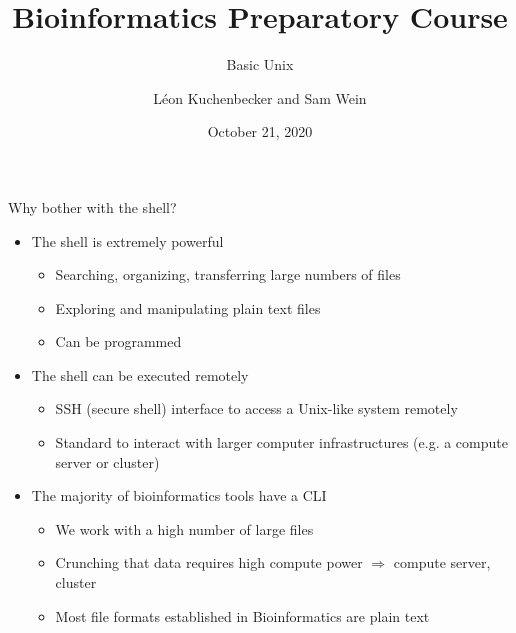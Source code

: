 \documentclass[aspectratio=1610]{beamer}
\title{Bioinformatics Preparatory Course}
\subtitle{Basic Unix}
\author{Léon Kuchenbecker and Sam Wein}
\date{October 21, 2020}
\begin{document}

\begin{frame}
    \titlepage
\end{frame}



\begin{frame}[c]{Why bother with the shell?}
    \begin{itemize}[<+->]\setlength\itemsep{1em}
        \item The shell is extremely powerful

            \begin{itemize}[<.->]
                \item Searching, organizing, transferring large numbers of files
                \item Exploring and manipulating plain text files
                \item Can be programmed
            \end{itemize}

        \item The shell can be executed remotely

            \begin{itemize}[<.->]
                \item SSH (secure shell) interface to access a Unix-like system remotely
                \item Standard to interact with larger computer infrastructures (e.g. a compute
                    server or cluster)
            \end{itemize}

        \item The majority of bioinformatics tools have a CLI
            \begin{itemize}[<.->]
                \item We work with a high number of large files
                \item Crunching that data requires high compute power $\Rightarrow$ compute server,
                    cluster
                \item Most file formats established in Bioinformatics are plain text
            \end{itemize}
    \end{itemize}
\end{frame}
\end{document}
